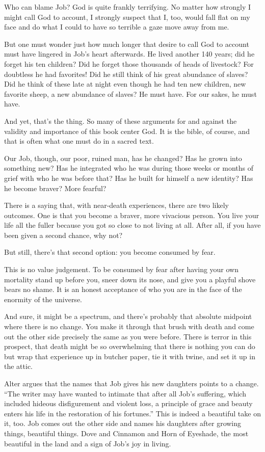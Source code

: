 Who can blame Job? God is quite frankly terrifying. No matter how strongly I might call God to account, I strongly suspect that I, too, would fall flat on my face and do what I could to have so terrible a gaze move away from me.

But one must wonder just how much longer that desire to call God to account must have lingered in Job's heart afterwards. He lived another 140 years; did he forget his ten children? Did he forget those thousands of heads of livestock? For doubtless he had favorites! Did he still think of his great abundance of slaves? Did he think of these late at night even though he had ten new children, new favorite sheep, a new abundance of slaves? He must have. For our sakes, he must have.

And yet, that's the thing. So many of these arguments for and against the validity and importance of this book center God. It is the bible, of course, and that is often what one must do in a sacred text.

Our Job, though, our poor, ruined man, has he changed? Has he grown into something new? Has he integrated who he was during those weeks or months of grief with who he was before that? Has he built for himself a new identity? Has he become braver? More fearful?

There is a saying that, with near-death experiences, there are two likely outcomes. One is that you become a braver, more vivacious person. You live your life all the fuller because you got so close to not living at all. After all, if you have been given a second chance, why not?

But still, there's that second option: you become consumed by fear.

This is no value judgement. To be consumed by fear after having your own mortality stand up before you, sneer down its nose, and give you a playful shove bears no shame. It is an honest acceptance of who you are in the face of the enormity of the universe.

And sure, it might be a spectrum, and there's probably that absolute midpoint where there is no change. You make it through that brush with death and come out the other side precisely the same as you were before. There is terror in this prospect, that death might be so overwhelming that there is nothing you can do but wrap that experience up in butcher paper, tie it with twine, and set it up in the attic.

Alter argues that the names that Job gives his new daughters points to a change. ``The writer may have wanted to intimate that after all Job's suffering, which included hideous disfigurement and violent loss, a principle of grace and beauty enters his life in the restoration of his fortunes.'' \parencite[579]{alter} This is indeed a beautiful take on it, too. Job comes out the other side and names his daughters after growing things, beautiful things. Dove and Cinnamon and Horn of Eyeshade, the most beautiful in the land and a sign of Job's joy in living.

